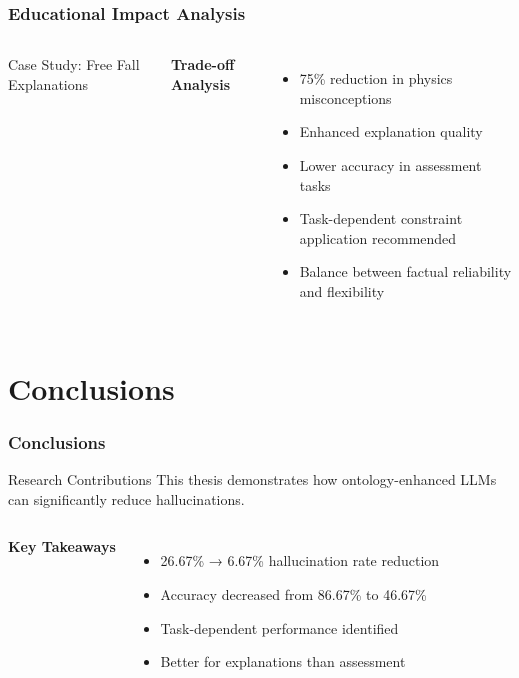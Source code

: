 \documentclass{beamer}
\begin{document}
\begin{frame}
\frametitle{Educational Impact Analysis}

\begin{columns}
\begin{block}{Case Study: Free Fall Explanations}
\begin{center}
\end{center}
\end{block}

\textbf{Trade-off Analysis}
\begin{itemize}
    \item 75\% reduction in physics misconceptions
    \item Enhanced explanation quality
    \item Lower accuracy in assessment tasks
    \item Task-dependent constraint application recommended
    \item Balance between factual reliability and flexibility
\end{itemize}
\end{columns}
\end{frame}

\section{Conclusions}

\begin{frame}
\frametitle{Conclusions}

\begin{alertblock}{Research Contributions}
This thesis demonstrates how ontology-enhanced LLMs can significantly reduce hallucinations.
\end{alertblock}

\begin{columns}
\textbf{Key Takeaways}
\begin{itemize}
    \item 26.67\% → 6.67\% hallucination rate reduction
    \item Accuracy decreased from 86.67\% to 46.67\%
    \item Task-dependent performance identified
    \item Better for explanations than assessment
\end{itemize}
\end{columns}
\end{frame}
\end{document}
